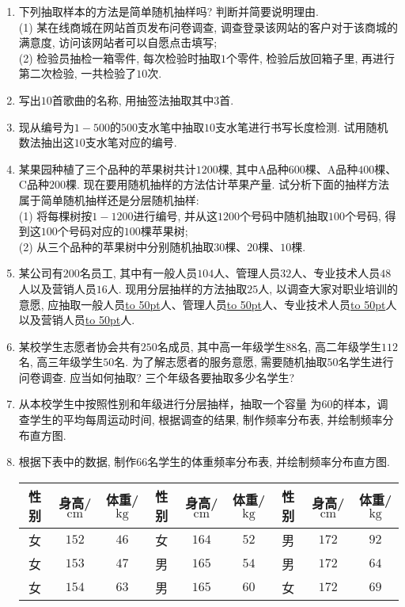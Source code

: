 \documentclass[10pt,a4paper]{article}
\newcommand{\blank}[1]{\underline{\hbox to #1pt{}}}
\begin{document}
\begin{enumerate}[1.]
\item 下列抽取样本的方法是简单随机抽样吗? 判断并简要说明理由.\\
(1) 某在线商城在网站首页发布问卷调查, 调查登录该网站的客户对于该商城的满意度, 访问该网站者可以自愿点击填写;\\
(2) 检验员抽检一箱零件, 每次检验时抽取$1$个零件, 检验后放回箱子里, 再进行第二次检验, 一共检验了$10$次.
\item 写出$10$首歌曲的名称, 用抽签法抽取其中$3$首.
\item 现从编号为$1-500$的$500$支水笔中抽取$10$支水笔进行书写长度检测. 试用随机数法抽出这$10$支水笔对应的编号.
\item 某果园种植了三个品种的苹果树共计$1200$棵, 其中A品种$600$棵、A品种$400$棵、C品种$200$棵. 现在要用随机抽样的方法估计苹果产量. 试分析下面的抽样方法属于简单随机抽样还是分层随机抽样:\\
(1) 将每棵树按$1-1200$进行编号, 并从这$1200$个号码中随机抽取$100$个号码, 得到这$100$个号码对应的$100$棵苹果树;\\
(2) 从三个品种的苹果树中分别随机抽取$30$棵、$20$棵、$10$棵.
\item 某公司有$200$名员工, 其中有一般人员$104$人、管理人员$32$人、专业技术人员$48$人以及营销人员$16$人. 现用分层抽样的方法抽取$25$人, 以调查大家对职业培训的意愿, 应抽取一般人员\blank{50}人、管理人员\blank{50}人、专业技术人员\blank{50}人以及营销人员\blank{50}人.
\item 某校学生志愿者协会共有$250$名成员, 其中高一年级学生$88$名, 高二年级学生$112$名, 高三年级学生$50$名. 为了解志愿者的服务意愿, 需要随机抽取$50$名学生进行问卷调查. 应当如何抽取? 三个年级各要抽取多少名学生?
\item 从本校学生中按照性别和年级进行分层抽样，抽取一个容量
为$60$的样本，调查学生的平均每周运动时间, 根据调查的结果, 制作频率分布表, 并绘制频率分布直方图.
\item 根据下表中的数据, 制作$66$名学生的体重频率分布表, 并绘制频率分布直方图. 
\begin{center}
\begin{longtable}{|c|c|c|c|c|c|c|c|c|}
\hline
性别  & 身高/$\text{cm}$ & 体重/$\text{kg}$ & 性别  & 身高/$\text{cm}$ & 体重/$\text{kg}$ & 性别  & 身高/$\text{cm}$ & 体重/$\text{kg}$ \\ \hline
\endhead
女 & $152$ & $46$ & 女 & $164$ & $52$ & 男 & $172$ & $92$ \\ \hline
女 & $153$ & $47$ & 男 & $165$ & $54$ & 男 & $172$ & $64$ \\ \hline
女 & $154$ & $63$ & 男 & $165$ & $60$ & 女 & $172$ & $69$ \\ \hline

\end{longtable}
\end{center}
\end{enumerate}
\end{document}
